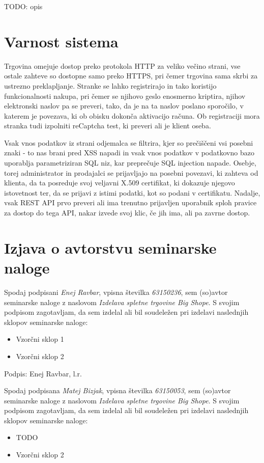 \documentclass[a4paper,12pt]{report}
\newcommand{\naslov}     {Izdelava spletne trgovine Big Shope}
\newcommand{\prviavtor}  {Enej Ravbar}
\newcommand{\prviindeks} {63150236}
\newcommand{\drugiavtor} {Matej Bizjak}
\newcommand{\drugiindeks}{63150053}
\begin{document}
TODO: opis

\chapter{Varnost sistema}

Trgovina omejuje dostop preko protokola HTTP za veliko večino strani, vse ostale zahteve so dostopne samo preko HTTPS, pri čemer trgovina sama skrbi za ustrezno preklapljanje. Stranke se lahko registrirajo in tako koristijo funkcionalnosti nakupa, pri čemer se njihovo geslo enosmerno kriptira, njihov elektronski naslov pa se preveri, tako, da je na ta naslov poslano sporočilo, v katerem je povezava, ki ob obisku dokonča aktivacijo računa. Ob registraciji mora stranka tudi izpolniti reCaptcha test, ki preveri ali je klient oseba.

Vsak vnos podatkov iz strani odjemalca se filtrira, kjer so prečiščeni vsi posebni znaki - to nas brani pred XSS napadi in vsak vnos podatkov v podatkovno bazo uporablja parametriziran SQL niz, kar preprečuje SQL injection napade. Osebje, torej administrator in prodajalci se prijavljajo na posebni povezavi, ki zahteva od klienta, da ta posreduje svoj veljavni X.509 certifikat, ki dokazuje njegovo istovetnost ter, da se prijavi z istimi podatki, kot so podani v certifikatu. Nadalje, vsak REST API prvo preveri ali ima trenutno prijavljen uporabnik sploh pravice za dostop do tega API, nakar izvede svoj klic, če jih ima, ali pa zavrne dostop.

\chapter{Izjava o avtorstvu seminarske naloge}

Spodaj podpisani \textit{\prviavtor}, vpisna številka \textit{\prviindeks}, sem (so)avtor seminarske naloge z naslovom \textit{\naslov}. S svojim podpisom zagotavljam, da sem izdelal ali bil soudeležen pri izdelavi naslednjih sklopov seminarske naloge:
\begin{itemize}
    \item Vzorčni sklop 1
	\item Vzorčni sklop 2
\end{itemize}

Podpis: {\prviavtor}, l.r.

\newpage

Spodaj podpisana \textit{\drugiavtor}, vpisna številka \textit{\drugiindeks}, sem (so)avtor seminarske naloge z naslovom \textit{\naslov}. S svojim podpisom zagotavljam, da sem izdelal ali bil soudeležen pri izdelavi naslednjih sklopov seminarske naloge:
\begin{itemize}
    \item TODO
    \item Vzorčni sklop 2
\end{itemize}
\end{document}
